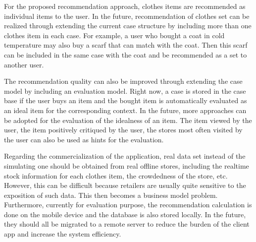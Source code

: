 For the proposed recommendation approach, clothes items are recommended as individual items to the user. In the future, recommendation of clothes set can be realized through extending the current case structure by including more than one clothes item in each case. For example, a user who bought a coat in cold temperature may also buy a scarf that can match with the coat. Then this scarf can be included in the same case with the coat and be recommended as a set to another user.

The recommendation quality can also be improved through extending the case model by including an evaluation model. Right now, a case is stored in the case base if the user buys an item and the bought item is automatically evaluated as an ideal item for the corresponding context. In the future, more approaches can be adopted for the evaluation of the idealness of an item. The item viewed by the user, the item positively critiqued by the user, the stores most often visited by the user can also be used as hints for the evaluation. 

Regarding the commercialization of the application, real data set instead of the simulating one should be obtained from real offline stores, including the realtime stock information for each clothes item, the crowdedness of the store, etc. However, this can be difficult because retailers are usually quite sensitive to the exposition of such data. This then becomes a business model problem. Furthermore, currently for evaluation purpose, the recommendation calculation is done on the mobile device and the database is also stored locally. In the future, they should all be migrated to a remote server to reduce the burden of the client app and increase the system efficiency.

